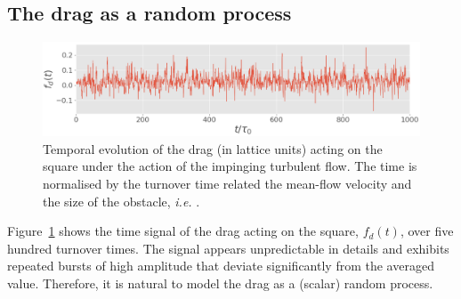 \documentclass{jfm}
\newcommand{\EL}[1]{{\color{myred}{#1}}}
\begin{document}
\subsection{The drag as a random process
}
\label{sec:pdfs}

\begin{figure}
  \centering
  \includegraphics[width=0.7\linewidth]{typical_drag_signal/typical_drag_signal.png}
  \caption{Temporal evolution of the drag (in lattice units) acting on the square under the action of the impinging turbulent flow. The time is normalised by the turnover time related the mean-flow velocity and the size of the obstacle, \emph{i.e.} \EL{$T_0=R/U$}.}
  \label{fig:typical_drag_signal}
\end{figure}



% 
Figure~\ref{fig:typical_drag_signal} shows the time signal of the drag acting on the square, $f_d(t)$, over five hundred turnover times.
The signal appears unpredictable in details and exhibits repeated bursts of high amplitude that deviate significantly from the averaged value.
Therefore, it is natural to model the drag as a (scalar) random process.
\end{document}
